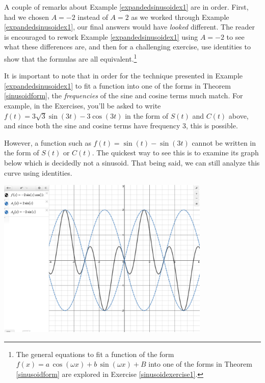 A couple of remarks about Example \ref{expandedsinusoidex1} are in order.   First, had we chosen  $A = -2$ instead of $A = 2$ as we worked through Example \ref{expandedsinusoidex1}, our final answers would have \textit{looked} different. The reader is encouraged to rework Example  \ref{expandedsinusoidex1} using $A = -2$ to see what these differences are, and then for a challenging exercise, use identities to show that the formulas are all equivalent.\footnote{The general equations to fit a function of the form $f(x) = a \, \cos(\omega x) + b \, \sin(\omega x) + B$ into one of the forms in Theorem \ref{sinusoidform} are explored in Exercise \ref{sinusoidexercise1}.}

\smallskip

It is important to note that in order for the technique presented in Example \ref{expandedsinusoidex1} to fit a function into one of the forms in Theorem \ref{sinusoidform},  the \textit{frequencies} of the sine and cosine terms much match.  For example,  in the Exercises, you'll be asked to write $f(t) = 3\sqrt{3}\sin(3t) - 3\cos(3t)$ in the form of $S(t)$ and $C(t)$ above, and since both the sine and cosine terms have frequency $3$, this is possible.

\smallskip

However, a function such as  $f(t) = \sin(t) - \sin(3t)$ cannot be written in the form of $S(t)$ or $C(t)$. The quickest way to see this is to examine its graph below which is decidedly not a sinusoid.  That being said, we can still analyze this curve using identities.

\label{beats}

\smallskip


\begin{center}

\includegraphics[width=4in]{./MoreTrigonometricIdentitiesGraphics/Beats.jpg} 

\end{center}


